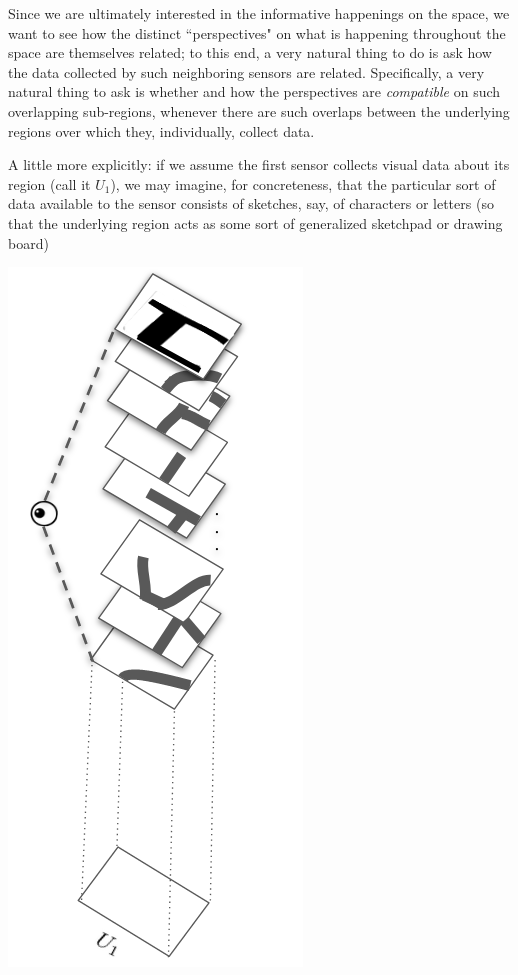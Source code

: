 \documentclass[a4paper]{book}
\theoremstyle{definition}
\theoremstyle{definition}
\theoremstyle{definition}
\theoremstyle{theorem}
\theoremstyle{definition}
\begin{document}
	Since we are ultimately interested in the informative happenings on the space, we want to see how the distinct ``perspectives" on what is happening throughout the space are themselves related; to this end, a very natural thing to do is ask how the data collected by such neighboring sensors are related. Specifically, a very natural thing to ask is whether and how the perspectives are \textit{compatible} on such overlapping sub-regions, whenever there are such overlaps between the underlying regions over which they, individually, collect data. \par 
	A little more explicitly: if we assume the first sensor collects visual data about its region (call it $U_1$), we may imagine, for concreteness, that the particular sort of data available to the sensor consists of sketches, say, of characters or letters (so that the underlying region acts as some sort of generalized sketchpad or drawing board)   
	\begin{center}
		\includegraphics[scale=0.25]{EyeballBest.png}
	\end{center}
\end{document}

